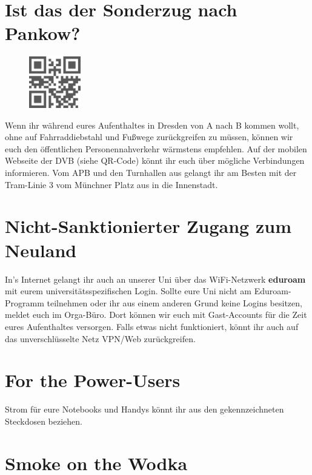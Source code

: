\section*{Ist das der Sonderzug nach Pankow?}

\begin{figure}
  \vspace{-12pt}
  \begin{centering}
    \includegraphics[width=0.2\textwidth,keepaspectratio]{img/dvb_mobil.png}
  \end{centering}
  \vspace{-15pt}
\end{figure}

Wenn ihr während eures Aufenthaltes in Dresden von A nach B kommen wollt, ohne auf Fahrraddiebstahl und Fußwege zurückgreifen zu müssen, können wir euch den öffentlichen Personennahverkehr wärmstens empfehlen.
Auf der mobilen Webseite der DVB (siehe QR-Code) könnt ihr euch über mögliche Verbindungen informieren.
Vom APB und den Turnhallen aus gelangt ihr am Besten mit der Tram-Linie 3 vom Münchner Platz aus in die Innenstadt.

\section*{Nicht-Sanktionierter Zugang zum Neuland}

In's Internet gelangt ihr auch an unserer Uni über das WiFi-Netzwerk \textbf{eduroam} mit eurem universitätsspezifischen Login.
Sollte eure Uni nicht am Eduroam-Programm teilnehmen oder ihr aus einem anderen Grund keine Logins besitzen, meldet euch im Orga-Büro.
Dort können wir euch mit Gast-Accounts für die Zeit eures Aufenthaltes versorgen.
Falls etwas nicht funktioniert, könnt ihr auch auf das unverschlüsselte Netz VPN/Web zurückgreifen.

\section*{For the Power-Users}

Strom für eure Notebooks und Handys könnt ihr aus den gekennzeichneten Steckdosen beziehen.

\section*{Smoke on the Wodka}


